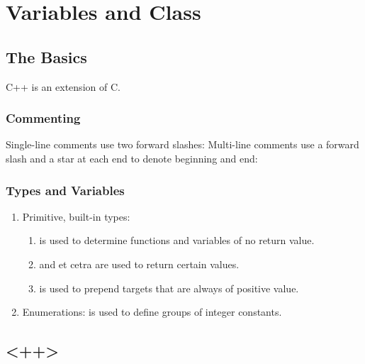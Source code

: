 \chapter{Variables and Class}

\section{The Basics}
C++ is an extension of C.

\subsection{Commenting}
Single-line comments use two forward slashes: 
Multi-line comments use a forward slash and a star at each end to denote
beginning and end: \\

\subsection{Types and Variables}
\begin{enumerate}
\item Primitive, built-in types:
    \begin{enumerate}
    \item {} is used to determine functions and variables
        of no return value.
    \item {} and et cetra are used
        to return certain values.
    \item {} is used to prepend targets that are always
        of positive value.
    \end{enumerate}
\item Enumerations:  is used to define groups of integer constants.
\end{enumerate}

\section{<++>}

